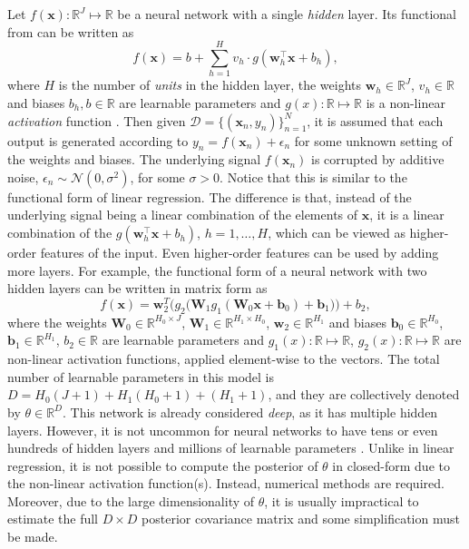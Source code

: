 \documentclass[msc,deptreport.inf]{infthesis} %
\newcommand{\matr}[1]{\mathbf{#1}}
\newcommand{\R}{\mathbb R}
\begin{document}
Let $f(\matr{x}): \R^J \mapsto \R$ be a neural network with a single \emph{hidden} layer. Its functional from can be written as
\begin{equation}
	f(\matr{x}) = b + \sum_{h=1}^H v_h \cdot g(\matr{w}_h^\intercal \matr{x} + b_h),
\end{equation} 
where $H$ is the number of \emph{units} in the hidden layer, the weights $\matr{w}_h \in \R^J$, $v_h \in \R$ and biases $b_h, b \in \R$ are learnable parameters and $g(x):\R \mapsto \R$ is a non-linear \emph{activation} function \cite{goodfellow2016}. Then given $\mathcal{D} = \{(\matr{x}_n, y_n)\}_{n=1}^{N}$, it is assumed that each output is generated according to $y_n = f(\matr{x}_n) + \epsilon_n$ for some unknown setting of the weights and biases. The underlying signal $f(\matr{x}_n)$ is corrupted by additive noise, $\epsilon_n \sim \mathcal{N}(0, \sigma^2)$, for some $\sigma > 0$. Notice that this is similar to the functional form of linear regression. The difference is that, instead of the underlying signal being a linear combination of the elements of $\matr{x}$, it is a linear combination of the $g(\matr{w}_h^\intercal \matr{x} + b_h)$, $h=1,\dots,H$, which can be viewed as higher-order features of the input.  Even higher-order features can be used by adding more layers. For example, the functional form of a neural network with two hidden layers can be written in matrix form as
\begin{equation}\label{eqn:multi_layer_nn}
	f(\matr{x}) = \matr{w}_2^T \Big(g_2\big(\matr{W}_1 g_1(\matr{W}_0 \matr{x} + \matr{b}_0) + \matr{b}_1 \big) \Big) + b_2,
\end{equation} 
where the weights $\matr{W}_0 \in \R^{H_0 \times J}$, $\matr{W}_1 \in \R^{H_1 \times H_0}$, $\matr{w}_2 \in \R^{H_1}$ and biases $\matr{b}_0 \in \R^{H_0}$, $\matr{b}_1 \in \R^{H_1}$, $b_2 \in \R$ are learnable parameters and $g_1(x):\R \mapsto \R$, $g_2(x):\R \mapsto \R$ are non-linear activation functions, applied element-wise to the vectors. The total number of learnable parameters in this model is $D=H_0(J + 1) + H_1(H_0 + 1) + (H_1 + 1)$, and they are collectively denoted by $\theta \in \R^D$. This network is already considered \emph{deep}, as it has multiple hidden layers. However, it is not uncommon for neural networks to have tens or even hundreds of hidden layers and millions of learnable parameters \cite{dai2021, shoeybi2019}. Unlike in linear regression, it is not possible to compute the posterior of $\theta$ in closed-form due to the non-linear activation function(s). Instead, numerical methods are required. Moreover, due to the large dimensionality of $\theta$, it is usually impractical to estimate the full $D \times D$ posterior covariance matrix and some simplification must be made.  
\end{document}
